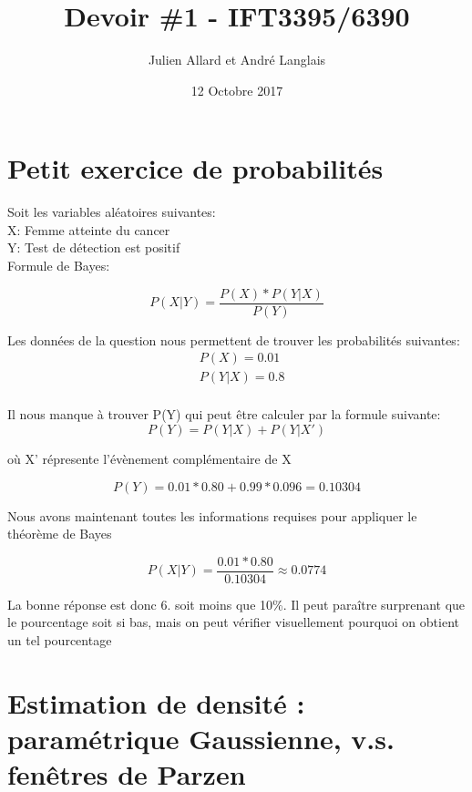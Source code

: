 \documentclass{article}
\title{Devoir \#1 - IFT3395/6390}
\author{Julien Allard et André Langlais}
\date{12 Octobre 2017}
\begin{document}
	
	\maketitle
	\newpage
	\section{Petit exercice de probabilités}
	\indent Soit les variables aléatoires suivantes: \\	
	 		X: Femme atteinte du cancer \\ 		 			
	 		Y: Test de détection est positif \\
	 		
	 Formule de Bayes:
	 	
	 \begin{equation}
		P(X|Y)= \frac{P(X)*P(Y|X)}{P(Y)}
	 \end{equation}
	 	
	 	
	 Les données de la question nous permettent de trouver les probabilités suivantes:
	 \begin{equation}
	 	\begin{split}
	 	& P(X) = 0.01 \\
	 	& P(Y|X)  = 0.8 \\
	 	\end{split}
	 \end{equation}
	 
	 Il nous manque à trouver {P(Y)} qui peut être calculer par la formule suivante:
	 \begin{equation}
	 P(Y) = P(Y|X) + P(Y|X')
	 \end{equation}
	 
	 où X' répresente l'évènement complémentaire de X
	 
	 \begin{equation}
	 P(Y)= 0.01*0.80 + 0.99*0.096 = 0.10304
	 \end{equation}
	 
	 Nous avons maintenant toutes les informations requises pour appliquer le théorème de Bayes
	 
	 	 \begin{equation}
	 	 P(X|Y)= \frac{0.01*0.80}{0.10304} \approx 0.0774
	 	 \end{equation}
	 
	 La bonne réponse est donc 6. soit moins que 10\%. 	 
	 Il peut paraître surprenant que le pourcentage soit si bas, mais on peut vérifier visuellement pourquoi on obtient un tel pourcentage
	
	
	\section{Estimation de densité : paramétrique Gaussienne,
		v.s. fenêtres de Parzen}
\end{document}
